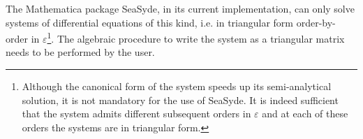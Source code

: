 \documentclass[final,1p,times]{elsarticle}
\begin{document}

The {\sc Mathematica} package {\sc SeaSyde}, in its current implementation, can only solve systems of differential equations of this kind, i.e. in triangular form order-by-order in $\varepsilon$\footnote{
Although the canonical form \cite{Henn:2014qga} of the system speeds up its semi-analytical solution, it is not mandatory for the use of {\sc SeaSyde}. It is indeed sufficient that the system admits different subsequent orders in $\varepsilon$ and at each of these orders the systems are in triangular form.
}. The algebraic procedure to write the system as a triangular matrix needs to be performed by the user.
\end{document}
